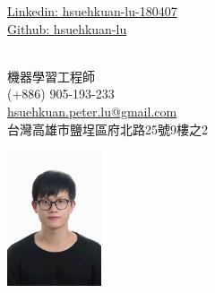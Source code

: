 \begin{center}
	\begin{minipage}[b]{0.24\textwidth}
		{\href{https://www.linkedin.com/in/hsuehkuan-lu-180407/}{Linkedin: hsuehkuan-lu-180407} } \\
		\href{https://github.com/hsuehkuan-lu}{Github: hsuehkuan-lu}
		
	\end{minipage}%
	\begin{minipage}[b]{0.5\textwidth}
		\centering
		{} \\ %
		\vspace{0.1cm}
		{\color{UI_blue} \Large{機器學習工程師}} \\
		\large (+886) 905-193-233 \\
		\large \href{mailto:hsuehkuan.peter.lu@gmail.com}{hsuehkuan.peter.lu@gmail.com} \\
		\small 台灣高雄市鹽埕區府北路25號9樓之2 \\
	\end{minipage}%
	\begin{minipage}[b]{0.24\textwidth}
		\flushright \large  %
		\includegraphics[width=2.8cm, height=4cm]{images/me.jpg}
	\end{minipage}
	
\end{center}